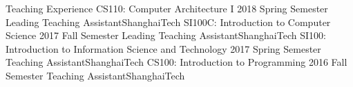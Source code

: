 \ifx\lang\eng
	\begin{rSection}{Teaching Experience}
		\rItem
			{CS110: Computer Architecture I }{ 2018 Spring Semester }
			{Leading Teaching Assistant}{ShanghaiTech}
		\rItem
			{SI100C: Introduction to Computer Science }{ 2017 Fall Semester }
			{Leading Teaching Assistant}{ShanghaiTech}
		\rItem
			{SI100: Introduction to Information Science and Technology }{ 2017 Spring Semester }
			{Teaching Assistant}{ShanghaiTech}
		\rItem
			{CS100: Introduction to Programming }{ 2016 Fall Semester }
			{Teaching Assistant}{ShanghaiTech}
	\end{rSection}
	\vspace{-1.75em}
\fi